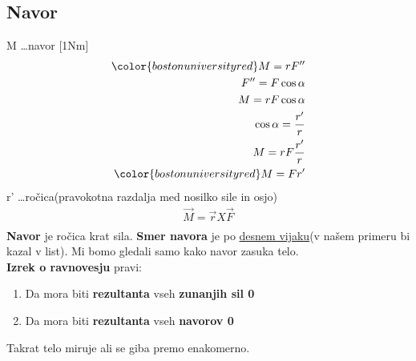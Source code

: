 {\color{indiagreen}\subsection{Navor}}
M \dots navor [1Nm]\\
\begin{align*}
	{\color{bostonuniversityred}M = rF''}\\
	F'' = F\cos\alpha\\
	M = rF\cos\alpha\\
	\cos\alpha = \frac{r'}{r}\\
	M = rF\frac{r'}{r}\\
	{\color{bostonuniversityred}M = Fr'}\\
\end{align*}
r' \dots ročica(pravokotna razdalja med nosilko sile in osjo)\\
\begin{align*}
	\vec{M} = \vec{r} X \vec{F}\\
\end{align*}
\textbf{Navor} je ročica krat sila. \textbf{Smer navora} je po \underline{desnem vijaku}(v našem primeru bi kazal v list). Mi bomo gledali samo kako navor zasuka telo.\\
\textbf{Izrek o ravnovesju} pravi:
\begin{enumerate}
	\item Da mora biti \textbf{rezultanta} vseh \textbf{zunanjih sil 0}
	\item Da mora biti \textbf{rezultanta} vseh \textbf{navorov 0}
\end{enumerate}
Takrat telo miruje ali se giba premo enakomerno.